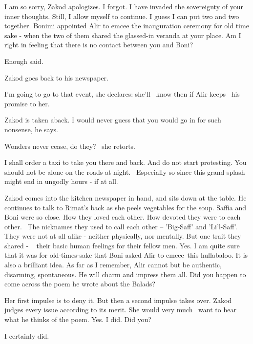 \documentclass[letterpaper]{article}
\begin{document}
{\textquotedbl}I am so sorry,{\textquotedbl} Zakod apologizes. {\textquotedbl}I forgot. I have invaded the sovereignty
of your inner thoughts. Still, I allow myself to continue. I guess I can put two and two together. Bonimi appointed
Alir to emcee the inauguration ceremony for old time sake - when the two of them shared the glassed-in veranda at your
place. Am I right in feeling that there is no contact between you and Boni?{\textquotedbl}

{\textquotedbl}Enough said.{\textquotedbl} 

Zakod goes back to his newspaper. 

{\textquotedbl}I'm going to go to that event,{\textquotedbl} she declares: she'll \ know then if Alir keeps \ his
promise to her.\textcolor[rgb]{0.0,0.6901961,0.9411765}{ }

Zakod is taken aback. {\textquotedbl}I would never guess that you would go in for such nonsense,{\textquotedbl} he says.

{\textquotedbl}Wonders never cease, do they?{\textquotedbl} \ she retorts. 

{\textquotedbl}I shall order a taxi to take you there and back. And do not start protesting. You should not be alone on
the roads at night. ~Especially so since this grand splash might end in ungodly hours - if at all.{\textquotedbl}~ 

Zakod comes into the kitchen newspaper in hand, and sits down at the table. He continues to talk to Rimat's back as she
peels vegetables for the soup. {\textquotedbl}Saffia and Boni were so close. How they loved each other. How devoted
they were to each other{.} \ The nicknames they used to call each other -- 'Big-Saff' and 'Li'l-Saff'.
They were not at all alike - neither physically, nor mentally. But one trait they shared -
~\textcolor[rgb]{0.0,0.6901961,0.9411765}{ }their basic human feelings for their fellow men. Yes. I am quite sure that
it was for old-times-sake that Boni asked Alir to emcee~this hullabaloo. It is also a brilliant idea. As far as I
remember, Alir cannot but be authentic, disarming, spontaneous. He will charm and impress them all. Did you happen to
come across the poem he wrote about the Balads?{\textquotedbl}

Her first impulse is to deny it. But then a second impulse takes over. Zakod judges every issue according to its merit.
She would very much \ want to hear what he thinks of the poem. {\textquotedbl}Yes. I did. Did you?{\textquotedbl}

{\textquotedbl}I certainly did.{\textquotedbl}
\end{document}
